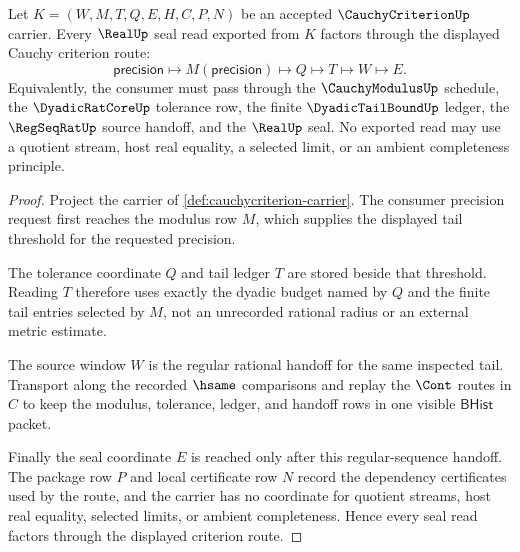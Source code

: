 \begin{theorem}
\label{thm:cauchycriterion-tail-bound-real-seal}
Let $K=(W,M,T,Q,E,H,C,P,N)$ be an accepted $\CauchyCriterionUp$ carrier. Every $\RealUp$ seal read exported from $K$ factors through the displayed Cauchy criterion route:
$$
\mathsf{precision}
\longmapsto
M(\mathsf{precision})
\longmapsto
Q
\longmapsto
T
\longmapsto
W
\longmapsto
E.
$$
Equivalently, the consumer must pass through the $\CauchyModulusUp$ schedule, the $\DyadicRatCoreUp$ tolerance row, the finite $\DyadicTailBoundUp$ ledger, the $\RegSeqRatUp$ source handoff, and the $\RealUp$ seal. No exported read may use a quotient stream, host real equality, a selected limit, or an ambient completeness principle.
\end{theorem}
\begin{proof}
Project the carrier of \autoref{def:cauchycriterion-carrier}. The consumer precision request first reaches the modulus row $M$, which supplies the displayed tail threshold for the requested precision.

The tolerance coordinate $Q$ and tail ledger $T$ are stored beside that threshold. Reading $T$ therefore uses exactly the dyadic budget named by $Q$ and the finite tail entries selected by $M$, not an unrecorded rational radius or an external metric estimate.

The source window $W$ is the regular rational handoff for the same inspected tail. Transport along the recorded $\hsame$ comparisons and replay the $\Cont$ routes in $C$ to keep the modulus, tolerance, ledger, and handoff rows in one visible $\mathsf{BHist}$ packet.

Finally the seal coordinate $E$ is reached only after this regular-sequence handoff. The package row $P$ and local certificate row $N$ record the dependency certificates used by the route, and the carrier has no coordinate for quotient streams, host real equality, selected limits, or ambient completeness. Hence every seal read factors through the displayed criterion route.
\end{proof}

